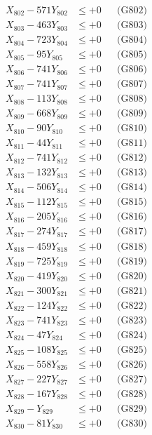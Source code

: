 \documentclass[a4paper,10pt]{article}
\begin{document}
{\begin{align}
X_{802} - 571Y_{802} &\leq +0 && \text{(G802)} \\
X_{803} - 463Y_{803} &\leq +0 && \text{(G803)} \\
X_{804} - 723Y_{804} &\leq +0 && \text{(G804)} \\
X_{805} - 95Y_{805} &\leq +0 && \text{(G805)} \\
X_{806} - 741Y_{806} &\leq +0 && \text{(G806)} \\
X_{807} - 741Y_{807} &\leq +0 && \text{(G807)} \\
X_{808} - 113Y_{808} &\leq +0 && \text{(G808)} \\
X_{809} - 668Y_{809} &\leq +0 && \text{(G809)} \\
X_{810} - 90Y_{810} &\leq +0 && \text{(G810)} \\
\allowbreak
X_{811} - 44Y_{811} &\leq +0 && \text{(G811)} \\
X_{812} - 741Y_{812} &\leq +0 && \text{(G812)} \\
X_{813} - 132Y_{813} &\leq +0 && \text{(G813)} \\
X_{814} - 506Y_{814} &\leq +0 && \text{(G814)} \\
X_{815} - 112Y_{815} &\leq +0 && \text{(G815)} \\
X_{816} - 205Y_{816} &\leq +0 && \text{(G816)} \\
X_{817} - 274Y_{817} &\leq +0 && \text{(G817)} \\
X_{818} - 459Y_{818} &\leq +0 && \text{(G818)} \\
X_{819} - 725Y_{819} &\leq +0 && \text{(G819)} \\
X_{820} - 419Y_{820} &\leq +0 && \text{(G820)} \\
\allowbreak
X_{821} - 300Y_{821} &\leq +0 && \text{(G821)} \\
X_{822} - 124Y_{822} &\leq +0 && \text{(G822)} \\
X_{823} - 741Y_{823} &\leq +0 && \text{(G823)} \\
X_{824} - 47Y_{824} &\leq +0 && \text{(G824)} \\
X_{825} - 108Y_{825} &\leq +0 && \text{(G825)} \\
X_{826} - 558Y_{826} &\leq +0 && \text{(G826)} \\
X_{827} - 227Y_{827} &\leq +0 && \text{(G827)} \\
X_{828} - 167Y_{828} &\leq +0 && \text{(G828)} \\
X_{829} - Y_{829} &\leq +0 && \text{(G829)} \\
X_{830} - 81Y_{830} &\leq +0 && \text{(G830)} \\

\end{align}}
\end{document}
